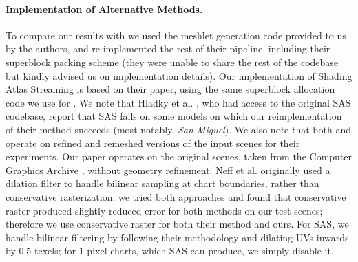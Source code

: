 \paragraph*{Implementation of Alternative Methods.} To compare our results with \cite{Neff2022MSA} we used the meshlet generation code provided to us by the authors, and re-implemented the rest of their pipeline, including their superblock packing scheme (they were unable to share the rest of the codebase but kindly advised us on implementation details). Our implementation of Shading Atlas Streaming \cite{mueller2018shading} is based on their paper, using the same superblock allocation code we use for \cite{Neff2022MSA}. We note that Hladky et al. , who had access to the original SAS codebase, report that SAS fails on some models on which our reimplementation of their method succeeds (most notably, {\em San Miguel}). We also note that both \cite{Neff2022MSA} and \cite{mueller2018shading} operate on refined and remeshed versions of the input scenes for their experiments. Our paper operates on the original scenes, taken from the Computer Graphics Archive \cite{McGuire2017Data}, without geometry refinement. Neff et al. originally used a dilation filter to handle bilinear sampling at chart boundaries, rather than conservative rasterization; we tried both approaches and found that conservative raster produced slightly reduced \FLIP error for both methods on our test scenes; therefore we use conservative raster for both their method and ours. For SAS, we handle bilinear filtering by following their methodology and dilating UVs inwards by $0.5$ texels; for 1-pixel charts, which SAS can produce, we simply disable it.

